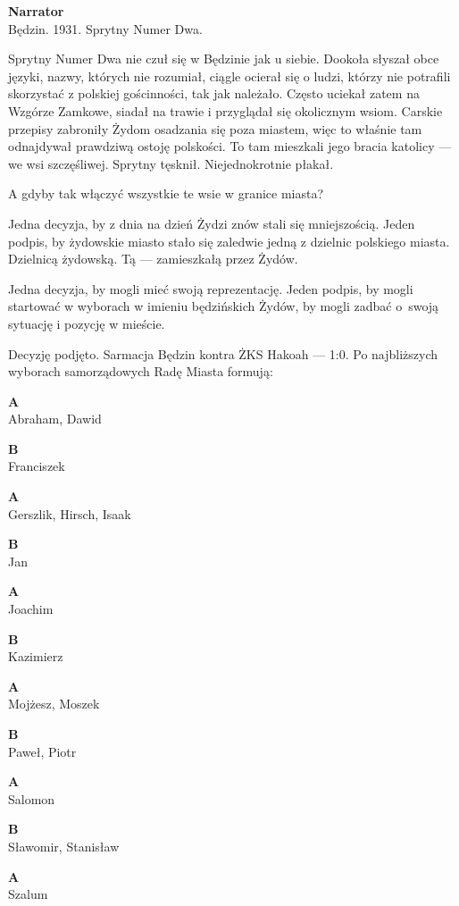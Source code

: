 \documentclass[11pt,a4paper,oneside]{article}
\begin{document}
\textbf{Narrator}\\
Będzin. 1931. Sprytny Numer Dwa. 

Sprytny Numer Dwa nie czuł się w Będzinie jak u siebie. Dookoła
słyszał obce języki, nazwy, których nie rozumiał, ciągle ocierał się o
ludzi, którzy nie potrafili skorzystać z polskiej gościnności, tak jak
należało. Często uciekał zatem na Wzgórze Zamkowe, siadał na trawie i
przyglądał się okolicznym wsiom. Carskie przepisy zabroniły Żydom
osadzania się poza miastem, więc to właśnie tam odnajdywał prawdziwą
ostoję polskości. To tam mieszkali jego bracia katolicy --- we wsi
szczęśliwej. Sprytny tęsknił. Niejednokrotnie płakał.

A gdyby tak włączyć wszystkie te wsie w granice miasta?

Jedna decyzja, by z dnia na dzień Żydzi znów stali się mniejszością.
Jeden podpis, by żydowskie miasto stało się zaledwie jedną z dzielnic
polskiego miasta.  Dzielnicą żydowską. Tą --- zamieszkałą przez Żydów. 

Jedna decyzja, by mogli mieć swoją reprezentację. Jeden podpis, by %
mogli startować w wyborach w imieniu będzińskich Żydów, by mogli
zadbać o~swoją sytuację i pozycję w mieście. 

Decyzję podjęto. Sarmacja Będzin kontra ŻKS Hakoah --- 1:0. Po
najbliższych wyborach samorządowych Radę Miasta formują:

\textbf{A}\\
Abraham, Dawid

\textbf{B}\\
Franciszek

\textbf{A}\\
Gerszlik, Hirsch, Isaak

\textbf{B}\\
Jan

\textbf{A}\\
Joachim

\textbf{B}\\
Kazimierz

\textbf{A}\\
Mojżesz,  Moszek

\textbf{B}\\
Paweł, Piotr

\textbf{A}\\
Salomon

\textbf{B}\\
Sławomir,  Stanisław

\textbf{A}\\
Szalum
\end{document}
